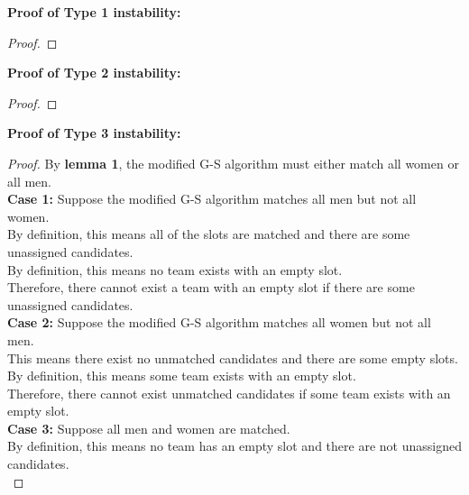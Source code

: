 \begin{problem}
    \noindent
    \textbf{Proof of Type 1 instability:}
    \begin{proof}
    \end{proof}
    \noindent
    \textbf{Proof of Type 2 instability:}
    \begin{proof}
    \end{proof}
    \noindent
    \textbf{Proof of Type 3 instability:}
    \begin{proof}
    By \textbf{lemma 1}, the modified G-S algorithm must either match all women or all men. \\
    \textbf{Case 1:} Suppose the modified G-S algorithm matches all men but not all women. \\
    By definition, this means all of the slots are matched and there are some unassigned candidates. \\
    By definition, this means no team exists with an empty slot. \\
    Therefore, there cannot exist a team with an empty slot if there are some unassigned candidates. \\
    \textbf{Case 2:} Suppose the modified G-S algorithm matches all women but not all men. \\
    This means there exist no unmatched candidates and there are some empty slots. \\
    By definition, this means some team exists with an empty slot. \\
    Therefore, there cannot exist unmatched candidates if some team exists with an empty slot. \\
    \textbf{Case 3:} Suppose all men and women are matched. \\
    By definition, this means no team has an empty slot and there are not unassigned candidates. \\
    \end{proof}
\end{problem}
